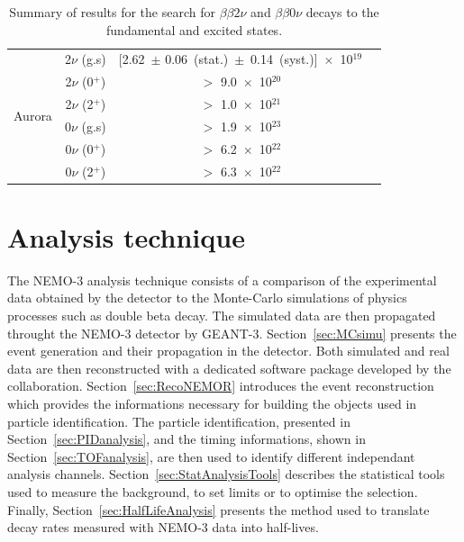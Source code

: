 \documentclass[main.tex]{subfiles}
\begin{document}
\begin{table}[h!]
\begin{center}
\begin{tabular}{c|c|c|c}
\multirow{6}{*}{Aurora} & 2$\nu$ (g.s) & [2.62~$\pm$ 0.06~(stat.)~$\pm$~0.14~(syst.)]~$\times$~10$^{\text{19}}$& \cite{Aurora}\\[0.1cm]
                        & 2$\nu$ (0$^+$) & $>$ 9.0~$\times$~10$^{\text{20}}$&\\[0.1cm]
                        & 2$\nu$ (2$^+$) & $>$ 1.0~$\times$~10$^{\text{21}}$&\\[0.1cm]
                        & 0$\nu$ (g.s)   & $>$ 1.9~$\times$~10$^{\text{23}}$&\\[0.1cm]
                        & 0$\nu$ (0$^+$) & $>$ 6.2~$\times$~10$^{\text{22}}$&\\[0.1cm]
                        & 0$\nu$ (2$^+$) & $>$ 6.3~$\times$~10$^{\text{22}}$&\\[0.1cm]
\bottomrule
\end{tabular}
\caption{Summary of results for the search for $\beta \beta 2\nu$ and $\beta \beta 0\nu$ decays to the fundamental and excited states.}
\label{TableSummaryResultsFS}
\end{center}
\end{table}


\FloatBarrier

\clearpage

\section{Analysis technique}\label{sec:AnalysisTechnique}


\NI The NEMO-3 analysis technique consists of a comparison of the experimental data obtained by the detector to the Monte-Carlo simulations of physics processes such as double beta decay. The simulated data are then propagated throught the NEMO-3 detector by GEANT-3. Section~\ref{sec:MCsimu} presents the event generation and their propagation in the detector. Both simulated and real data are then reconstructed with a dedicated software package developed by the collaboration. Section~\ref{sec:RecoNEMOR} introduces the event reconstruction which provides the informations necessary for building the objects used in particle identification. The particle identification, presented in Section~\ref{sec:PIDanalysis}, and the timing informations, shown in Section~\ref{sec:TOFanalysis}, are then used to identify different independant analysis channels. Section~\ref{sec:StatAnalysisTools} describes the statistical tools used to measure the background, to set limits or to optimise the selection. Finally, Section~\ref{sec:HalfLifeAnalysis} presents the method used to translate decay rates measured with NEMO-3 data into half-lives.
\end{document}
